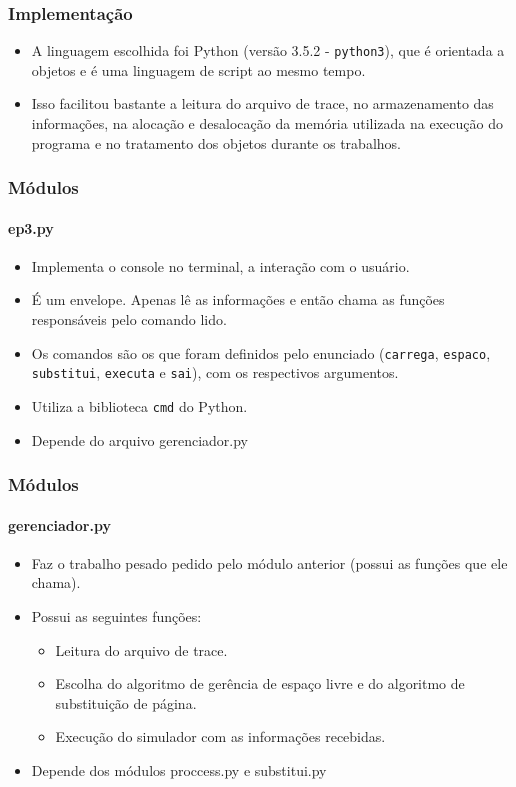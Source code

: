 \documentclass{beamer}
\begin{document}
\begin{frame}
	\frametitle{Implementação}
	\begin{itemize}
		\item A linguagem escolhida foi Python (versão 3.5.2 - \texttt{python3}), que é orientada a objetos e é uma linguagem de script ao mesmo tempo.
		\item Isso facilitou bastante a leitura do arquivo de trace, no armazenamento das informações, na alocação e desalocação da memória utilizada na execução do programa e no tratamento dos objetos durante os trabalhos.
	\end{itemize}
\end{frame}

\begin{frame}
	\frametitle{Módulos}
	\framesubtitle{ep3.py}
	\begin{itemize}
		\item Implementa o console no terminal, a interação com o usuário.
		\item É um envelope. Apenas lê as informações e então chama as funções responsáveis pelo comando lido.
		\item Os comandos são os que foram definidos pelo enunciado (\texttt{carrega}, \texttt{espaco}, \texttt{substitui}, \texttt{executa} e \texttt{sai}), com os respectivos argumentos.
		\item Utiliza a biblioteca \texttt{cmd} do Python.
		\item Depende do arquivo gerenciador.py
	\end{itemize}
\end{frame}

\begin{frame}
	\frametitle{Módulos}
	\framesubtitle{gerenciador.py}
	\begin{itemize}
		\item Faz o trabalho pesado pedido pelo módulo anterior (possui as funções que ele chama).
		\item Possui as seguintes funções:
		\begin{itemize}
			\item Leitura do arquivo de trace.
			\item Escolha do algoritmo de gerência de espaço livre e do algoritmo de substituição de página.
			\item Execução do simulador com as informações recebidas.
		\end{itemize}
		\item Depende dos módulos proccess.py e substitui.py
	\end{itemize}
\end{frame}
\end{document}
